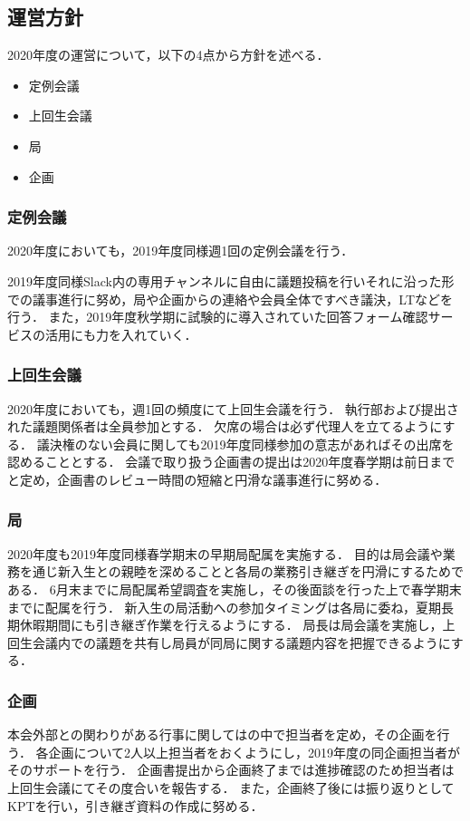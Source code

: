 \subsection*{運営方針}


2020年度の運営について，以下の4点から方針を述べる．
\begin{itemize}
    \item 定例会議
    \item 上回生会議
    \item 局
    \item 企画
\end{itemize}

\subsubsection*{定例会議}
2020年度においても，2019年度同様週1回の定例会議を行う．

2019年度同様Slack内の専用チャンネルに自由に議題投稿を行いそれに沿った形での議事進行に努め，局や企画からの連絡や会員全体ですべき議決，LTなどを行う．
また，2019年度秋学期に試験的に導入されていた回答フォーム確認サービスの活用にも力を入れていく．


\subsubsection*{上回生会議}
2020年度においても，週1回の頻度にて上回生会議を行う．
執行部および提出された議題関係者は全員参加とする．
欠席の場合は必ず代理人を立てるようにする．
議決権のない会員に関しても2019年度同様参加の意志があればその出席を認めることとする．
会議で取り扱う企画書の提出は2020年度春学期は前日までと定め，企画書のレビュー時間の短縮と円滑な議事進行に努める．

\subsubsection*{局}
2020年度も2019年度同様春学期末の早期局配属を実施する．
目的は局会議や業務を通じ新入生との親睦を深めることと各局の業務引き継ぎを円滑にするためである．
6月末までに局配属希望調査を実施し，その後面談を行った上で春学期末までに配属を行う．
新入生の局活動への参加タイミングは各局に委ね，夏期長期休暇期間にも引き継ぎ作業を行えるようにする．
局長は局会議を実施し，上回生会議内での議題を共有し局員が同局に関する議題内容を把握できるようにする．


\subsubsection*{企画}
本会外部との関わりがある行事に関しては\secondGrade{}の中で担当者を定め，その企画を行う．
各企画について2人以上担当者をおくようにし，2019年度の同企画担当者がそのサポートを行う．
企画書提出から企画終了までは進捗確認のため担当者は上回生会議にてその度合いを報告する．
また，企画終了後には振り返りとしてKPTを行い，引き継ぎ資料の作成に努める．

